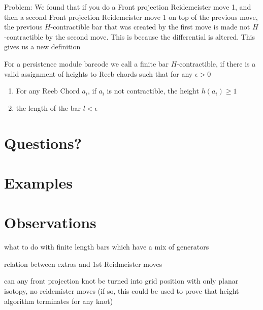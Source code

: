 \documentclass[11pt,oneside]{amsart}
\begin{document}
Problem: We found that if you do a Front projection Reidemeister move 1, and then a second Front projection Reidemeister move 1 on top of the previous move, the previous $H$-contractible bar that was created by the first move is made not $H$-contractible by the second move. This is because the differential is altered. This gives us a new definition

    \begin{definition}
        For a persistence module barcode we call a finite bar $H$-contractible, if there is a valid assignment of heights to Reeb chords such that for any $\epsilon > 0$
        \begin{enumerate}
            \item For any Reeb Chord $a_i$, if $a_i$ is not contractible, the height $h(a_i) \geq 1$
            \item the length of the bar $l < \epsilon$
        \end{enumerate}
    \end{definition}

\section{Questions?}



\section{Examples}



\section{Observations}





what to do with finite length bars which have a mix of generators

relation between extras and 1st Reidmeister moves

can any front projection knot be turned into grid position with only planar isotopy, no reidemister moves (if so, this could be used to prove that height algorithm terminates for any knot)
\end{document}
